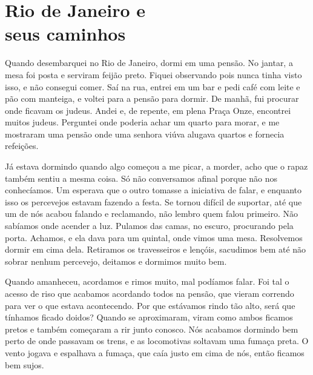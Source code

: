 \chapter*{Rio de Janeiro e\\seus caminhos}

Quando desembarquei no Rio de Janeiro, dormi em uma pensão. No
jantar, a mesa foi posta e serviram feijão preto. Fiquei observando
pois nunca tinha visto isso, e não consegui comer. Saí na rua, entrei
em um bar e pedi café com leite e pão com manteiga, e voltei para a
pensão para dormir. De manhã, fui procurar onde ficavam os judeus. Andei
e, de repente, em plena Praça Onze, encontrei muitos judeus.
Perguntei onde poderia achar um quarto para morar, e me
mostraram uma pensão onde uma senhora viúva alugava quartos e fornecia
refeições.


Já estava dormindo quando algo começou a me picar, a morder, acho que o
rapaz também sentiu a mesma coisa. Só não conversamos afinal porque não nos conhecíamos. Um esperava que o outro tomasse a iniciativa de
falar, e enquanto isso os percevejos estavam fazendo a festa. Se tornou
difícil de suportar, até que um de nós acabou falando e reclamando,
não lembro quem falou primeiro. Não sabíamos onde acender a
luz. Pulamos das camas, no escuro, procurando pela porta.
Achamos, e ela dava para um quintal, onde vimos uma mesa.
Resolvemos dormir em cima dela. Retiramos os travesseiros e lençóis,
sacudimos bem até não sobrar nenhum percevejo, deitamos e dormimos muito
bem.

Quando amanheceu, acordamos e rimos muito, mal podíamos falar. Foi tal o
acesso de riso que acabamos acordando todos na pensão, que vieram
correndo para ver o que estava acontecendo. Por que estávamos rindo tão
alto, será que tínhamos ficado doidos? Quando se aproximaram, viram
como ambos ficamos pretos e também começaram a rir junto conosco.
Nós acabamos dormindo bem perto de onde passavam os trens, e as
locomotivas soltavam uma fumaça preta. O vento jogava e espalhava a
fumaça, que caía justo em cima de nós, então ficamos bem sujos.

